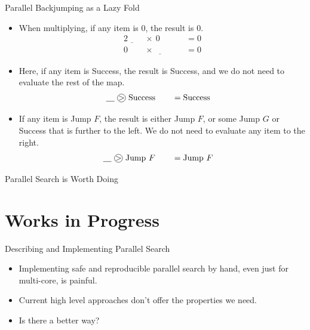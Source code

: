 \documentclass{beamer}
\newcommand*\circled[1]{\tikz[baseline=(char.base)]{
            \node[shape=circle,draw,inner sep=0pt] (char) {#1};}}
\begin{document}
\begin{frame}{Parallel Backjumping as a Lazy Fold}
     {
        \begin{itemize}
            \item When multiplying, if any item is 0, the result is 0.
                \begin{alignat*}{2}
                    \underline{\hspace{1em}} &~\times~ 0 \hspace{1em} &&= 0 \\
                    0 &~\times~ \underline{\hspace{1em}} \hspace{1em} &&= 0
                \end{alignat*}
            \item Here, if any item is Success, the result is Success, and we do not need to evaluate
                the rest of the map.
                \begin{alignat*}{2}
                    \underline{\hspace{1em}} &~\circled{$>$}~ \textnormal{Success} \hspace{1em} &&= \textnormal{Success}
                \end{alignat*}
            \item If any item is Jump $F$, the result is either Jump $F$, or some Jump $G$ or Success
                that is further to the left. We do not need to evaluate any item to the right.
                \begin{alignat*}{2}
                    \underline{\hspace{1em}} &~\circled{$>$}~ \textnormal{Jump}~F \hspace{1em} &&= \textnormal{Jump}~F
                \end{alignat*}
        \end{itemize}
    }

\end{frame}

\begin{frame}{Parallel Search is Worth Doing}

    \vskip-5pt 

\end{frame}

\section{Works in Progress}

\begin{frame}{Describing and Implementing Parallel Search}

    \begin{itemize}
        \item Implementing safe and reproducible parallel search by hand, even just for multi-core,
            is painful.
        \item Current high level approaches don't offer the properties we need.
        \item Is there a better way?
    \end{itemize}

\end{frame}
\end{document}
